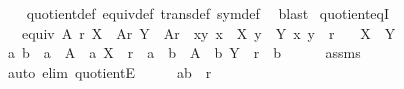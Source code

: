 \begin{isabellebody}
%
\isadelimproof
\ \ %
\endisadelimproof
%
\isatagproof
{}\isamarkupfalse%
\ quotient{\isacharunderscore}{\kern0pt}def\ equiv{\isacharunderscore}{\kern0pt}def\ trans{\isacharunderscore}{\kern0pt}def\ sym{\isacharunderscore}{\kern0pt}def\ \isamarkupfalse%
\ blast%
\endisatagproof
{\isafoldproof}%
%
\isadelimproof
\isanewline
%
\endisadelimproof
\isanewline
{}\isamarkupfalse%
\ quotient{\isacharunderscore}{\kern0pt}eqI{\isacharcolon}{\kern0pt}\isanewline
\ \ \ {\isachardoublequoteopen}equiv\ A\ r{\isachardoublequoteclose}\ {\isachardoublequoteopen}X\ {\isasymin}\ A{\isacharslash}{\kern0pt}{\isacharslash}{\kern0pt}r{\isachardoublequoteclose}\ {\isachardoublequoteopen}Y\ {\isasymin}\ A{\isacharslash}{\kern0pt}{\isacharslash}{\kern0pt}r{\isachardoublequoteclose}\ \ xy{\isacharcolon}{\kern0pt}\ {\isachardoublequoteopen}x\ {\isasymin}\ X{\isachardoublequoteclose}\ {\isachardoublequoteopen}y\ {\isasymin}\ Y{\isachardoublequoteclose}\ {\isachardoublequoteopen}{\isacharparenleft}{\kern0pt}x{\isacharcomma}{\kern0pt}\ y{\isacharparenright}{\kern0pt}\ {\isasymin}\ r{\isachardoublequoteclose}\isanewline
\ \ \ {\isachardoublequoteopen}X\ {\isacharequal}{\kern0pt}\ Y{\isachardoublequoteclose}\isanewline
%
\isadelimproof
%
\endisadelimproof
%
\isatagproof
{}\isamarkupfalse%
\ {\isacharminus}{\kern0pt}\isanewline
\ \ \isamarkupfalse%
\ a\ b\ \ {\isachardoublequoteopen}a\ {\isasymin}\ A{\isachardoublequoteclose}\ \ a{\isacharcolon}{\kern0pt}\ {\isachardoublequoteopen}X\ {\isacharequal}{\kern0pt}\ r\ {\isacharbackquote}{\kern0pt}{\isacharbackquote}{\kern0pt}\ {\isacharbraceleft}{\kern0pt}a{\isacharbraceright}{\kern0pt}{\isachardoublequoteclose}\ \ {\isachardoublequoteopen}b\ {\isasymin}\ A{\isachardoublequoteclose}\ \ b{\isacharcolon}{\kern0pt}\ {\isachardoublequoteopen}Y\ {\isacharequal}{\kern0pt}\ r\ {\isacharbackquote}{\kern0pt}{\isacharbackquote}{\kern0pt}\ {\isacharbraceleft}{\kern0pt}b{\isacharbraceright}{\kern0pt}{\isachardoublequoteclose}\isanewline
\ \ \ \ \isamarkupfalse%
\ assms\ \isamarkupfalse%
\ {\isacharparenleft}{\kern0pt}auto\ elim{\isacharbang}{\kern0pt}{\isacharcolon}{\kern0pt}\ quotientE{\isacharparenright}{\kern0pt}\isanewline
\ \ \isamarkupfalse%
\ \isamarkupfalse%
\ {\isachardoublequoteopen}{\isacharparenleft}{\kern0pt}a{\isacharcomma}{\kern0pt}b{\isacharparenright}{\kern0pt}\ {\isasymin}\ r{\isachardoublequoteclose}\isanewline

\end{isabellebody}
